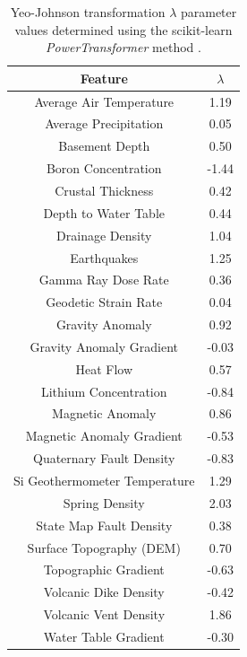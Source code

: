 \begin{table}[htp]
\centering
\begin{tabular}{|c|c|}
\hline
\textbf{Feature} & \textbf{$\lambda$} \\ \hline
Average Air Temperature & 1.19 \\ \hline
Average Precipitation & 0.05 \\ \hline
Basement Depth & 0.50 \\ \hline
Boron Concentration & -1.44 \\ \hline
Crustal Thickness & 0.42 \\ \hline
Depth to Water Table & 0.44 \\ \hline
Drainage Density & 1.04 \\ \hline
Earthquakes & 1.25 \\ \hline
Gamma Ray Dose Rate & 0.36 \\ \hline
Geodetic Strain Rate & 0.04 \\ \hline
Gravity Anomaly & 0.92 \\ \hline
Gravity Anomaly Gradient & -0.03 \\ \hline
Heat Flow & 0.57 \\ \hline
Lithium Concentration & -0.84 \\ \hline
Magnetic Anomaly & 0.86 \\ \hline
Magnetic Anomaly Gradient & -0.53 \\ \hline
Quaternary Fault Density & -0.83 \\ \hline
Si Geothermometer Temperature & 1.29 \\ \hline
Spring Density & 2.03 \\ \hline
State Map Fault Density & 0.38 \\ \hline
Surface Topography (DEM) & 0.70 \\ \hline
Topographic Gradient & -0.63 \\ \hline
Volcanic Dike Density & -0.42 \\ \hline
Volcanic Vent Density & 1.86 \\ \hline
Water Table Gradient & -0.30 \\ \hline
\end{tabular}
\caption[Yeo-Johnson transformation lambda values]{Yeo-Johnson transformation $\lambda$ parameter values determined using the scikit-learn \textit{PowerTransformer} method \protect\citep{scikit-learn_sklearnpreprocessingpowertransformer_2021}.}
\label{tab:yeo_lambdas}
\end{table}

